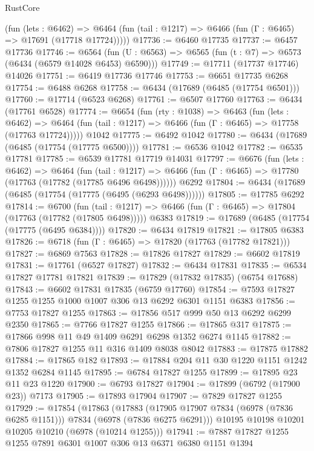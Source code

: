 \begin{lexlean}{RustCore}
\begin{coremodule}
      (fun (lets : @6462) =>
      @6464 (fun (tail : @1217) => @6466 (fun (Γ : @6465) => @17691 (@17718 @17724)))))
@17736 := @6460 @17735
@17737 := @6457 @17736
@17746 := @6564
    (fun (U : @6563) => @6565 (fun (t : @7) => @6573 (@6434 (@6579 @14028 @6453) @6590)))
@17749 := @17711 (@17737 @17746) @14026
@17751 := @6419 @17736 @17746
@17753 := @6651 @17735 @6268
@17754 := @6488 @6268
@17758 := @6434 (@17689 (@6485 (@17754 @6501)))
@17760 := @17714 (@6523 @6268)
@17761 := @6507 @17760
@17763 := @6434 (@17761 @6528)
@17774 := @6654
    (fun (rty : @1038) =>
    @6463
      (fun (lets : @6462) =>
      @6464 (fun (tail : @1217) => @6466 (fun (Γ : @6465) => @17758 (@17763 @17724)))))
    @1042
@17775 := @6492 @1042
@17780 := @6434 (@17689 (@6485 (@17754 (@17775 @6500))))
@17781 := @6536 @1042
@17782 := @6535 @17781
@17785 := @6539 @17781 @17719 @14031
@17797 := @6676
    (fun (lets : @6462) =>
    @6464
      (fun (tail : @1217) =>
      @6466 (fun (Γ : @6465) => @17780 (@17763 (@17782 (@17785 @6496 @6498))))))
    @6292
@17804 := @6434 (@17689 (@6485 (@17754 (@17775 (@6495 (@6293 @6498))))))
@17805 := @17785 @6292
@17814 := @6700
    (fun (tail : @1217) => @6466 (fun (Γ : @6465) => @17804 (@17763 (@17782 (@17805 @6498)))))
    @6383
@17819 := @17689 (@6485 (@17754 (@17775 (@6495 @6384))))
@17820 := @6434 @17819
@17821 := @17805 @6383
@17826 := @6718 (fun (Γ : @6465) => @17820 (@17763 (@17782 @17821)))
@17827 := @6869 @7563
@17828 := @17826 @17827
@17829 := @6602 @17819
@17831 := @17761 (@6527 @17827)
@17832 := @6434 @17831
@17835 := @6534 @17827 @17781 @17821
@17839 := @17829 (@17832 @17835) (@6754 @17688)
@17843 := @6602 @17831 @17835 (@6759 @17760)
@17854 := @7593 @17827 @1255 @1255 @1000 @1007 @306 @13 @6292 @6301 @1151 @6383
@17856 := @7753 @17827 @1255
@17863 := @17856 @517 @999 @50 @13 @6292 @6299 @2350
@17865 := @7766 @17827 @1255
@17866 := @17865 @317
@17875 := @17866 @998 @11 @49 @1409 @6291 @6298 @1352 @6274 @1145
@17882 := @7806 @17827 @1255 @11 @316 @1409 @8038 @8042
@17883 := @17875 @17882
@17884 := @17865 @182
@17893 := @17884 @204 @11 @30 @1220 @1151 @1242 @1352 @6284 @1145
@17895 := @6784 @17827 @1255
@17899 := @17895 @23 @11 @23 @1220
@17900 := @6793 @17827
@17904 := @17899 (@6792 (@17900 @23)) @7173
@17905 := @17893 @17904
@17907 := @7829 @17827 @1255
@17929 := @17854
    (@17863
      (@17883 (@17905 @17907 @7834 (@6978 (@7836 @6285 @1151))) @7834 (@6978 (@7836 @6275 @6291)))
      @10195
      @10198
      @10201
      @10205
      @10210
      (@6978 (@10214 @1255)))
@17941 := @7887 @17827 @1255 @1255 @7891 @6301 @1007 @306 @13 @6371 @6380 @1151 @1394

\end{coremodule}
\end{lexlean}
